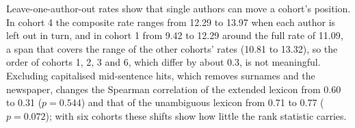 \documentclass[11pt]{article}
\begin{document}
Leave-one-author-out rates show that single authors can move a cohort's position. In cohort 4 the composite rate ranges from 12.29 to 13.97 when each author is left out in turn, and in cohort 1 from 9.42 to 12.29 around the full rate of 11.09, a span that covers the range of the other cohorts' rates (10.81 to 13.32), so the order of cohorts 1, 2, 3 and 6, which differ by about 0.3, is not meaningful.
Excluding capitalised mid-sentence hits, which removes surnames and the newspaper, changes the Spearman correlation of the extended lexicon from 0.60 to 0.31 ($p=0.544$) and that of the unambiguous lexicon from 0.71 to 0.77 ($p=0.072$); with six cohorts these shifts show how little the rank statistic carries.
\end{document}
